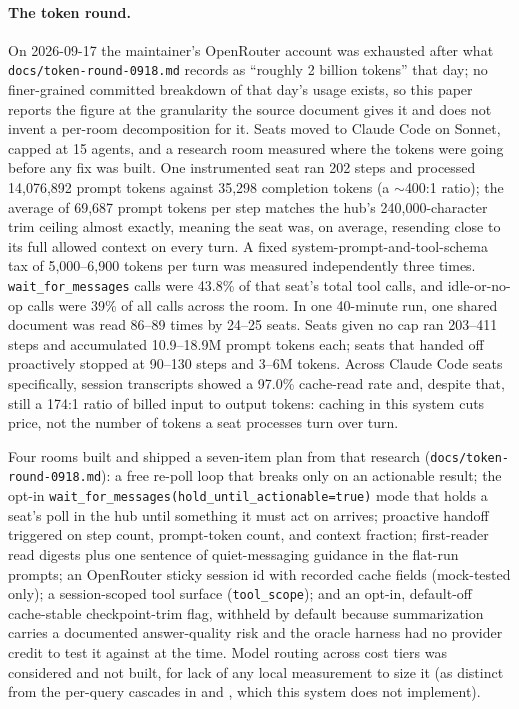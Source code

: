 \paragraph{The token round.} On 2026-09-17 the maintainer's OpenRouter account was
exhausted after what \texttt{docs/token-round-0918.md} records as ``roughly 2 billion
tokens'' that day; no finer-grained committed breakdown of that day's usage exists, so
this paper reports the figure at the granularity the source document gives it and does
not invent a per-room decomposition for it. Seats moved to Claude Code on Sonnet, capped
at 15 agents, and a research room measured where the tokens were going before any fix
was built. One instrumented seat ran 202 steps and processed 14,076,892 prompt tokens
against 35,298 completion tokens (a $\sim$400:1 ratio); the average of 69,687 prompt
tokens per step matches the hub's 240,000-character trim ceiling almost exactly, meaning
the seat was, on average, resending close to its full allowed context on every turn. A
fixed system-prompt-and-tool-schema tax of 5,000--6,900 tokens per turn was measured
independently three times. \texttt{wait\_for\_messages} calls were 43.8\% of that seat's
total tool calls, and idle-or-no-op calls were 39\% of all calls across the room. In one
40-minute run, one shared document was read 86--89 times by 24--25 seats. Seats given no
cap ran 203--411 steps and accumulated 10.9--18.9M prompt tokens each; seats that handed
off proactively stopped at 90--130 steps and 3--6M tokens. Across Claude Code seats
specifically, session transcripts showed a 97.0\% cache-read rate and, despite that,
still a 174:1 ratio of billed input to output tokens: caching in this system cuts price,
not the number of tokens a seat processes turn over turn.

Four rooms built and shipped a seven-item plan from that research (\texttt{docs/token-round-0918.md}):
a free re-poll loop that breaks only on an actionable result; the opt-in
\texttt{wait\_for\_messages(hold\_until\_actionable=true)} mode that holds a seat's poll
in the hub until something it must act on arrives; proactive handoff triggered on step
count, prompt-token count, and context fraction; first-reader read digests plus one
sentence of quiet-messaging guidance in the flat-run prompts; an OpenRouter sticky
session id with recorded cache fields (mock-tested only); a session-scoped tool surface
(\texttt{tool\_scope}); and an opt-in, default-off cache-stable checkpoint-trim flag,
withheld by default because summarization carries a documented answer-quality risk
\citep{Cim2026} and the oracle harness had no provider credit to test it against at the
time. Model routing across cost tiers was considered and not built, for lack of any
local measurement to size it (as distinct from the per-query cascades in
\citet{Chen2023} and \citet{Moslem2026}, which this system does not implement).

